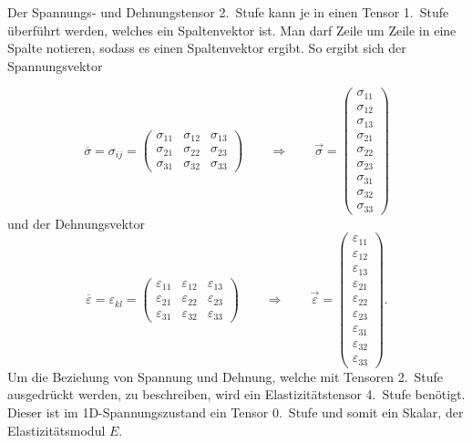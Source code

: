 Der Spannungs- und Dehnungstensor 2.~Stufe kann je in einen Tensor 1.~Stufe überführt werden, welches ein Spaltenvektor ist.
Man darf Zeile um Zeile in eine Spalte notieren, sodass es einen Spaltenvektor ergibt.
So ergibt sich der Spannungsvektor

\[
\overline{\sigma}
=
\sigma_{ij}
=
\begin{pmatrix}
	\sigma_{11} & \sigma_{12} & \sigma_{13} \\ 
	\sigma_{21} & \sigma_{22} & \sigma_{23} \\
	\sigma_{31} & \sigma_{32} & \sigma_{33}
\end{pmatrix}
\qquad
\Rightarrow
\qquad
\vec{\sigma}
=
\begin{pmatrix}
	\sigma_{11}\\
	\sigma_{12}\\
	\sigma_{13}\\
	\sigma_{21}\\
	\sigma_{22}\\
	\sigma_{23}\\
	\sigma_{31}\\
	\sigma_{32}\\
	\sigma_{33}
\end{pmatrix}
\]
und der Dehnungsvektor
\[
\overline{\varepsilon}
=
\varepsilon_{kl}
=
\begin{pmatrix}
	\varepsilon_{11} & \varepsilon_{12} & \varepsilon_{13} \\ 
	\varepsilon_{21} & \varepsilon_{22} & \varepsilon_{23} \\
	\varepsilon_{31} & \varepsilon_{32} & \varepsilon_{33}
\end{pmatrix}
\qquad
\Rightarrow
\qquad
\vec{\varepsilon}
=
\begin{pmatrix}
	\varepsilon_{11} \\
	\varepsilon_{12} \\
	\varepsilon_{13} \\
	\varepsilon_{21} \\
	\varepsilon_{22} \\
	\varepsilon_{23} \\
	\varepsilon_{31} \\
	\varepsilon_{32} \\
	\varepsilon_{33}
\end{pmatrix}
.
\]
Um die Beziehung von Spannung und Dehnung, welche mit Tensoren 2.~Stufe ausgedrückt werden, zu beschreiben, wird ein Elastizitätstensor 4.~Stufe benötigt.
%
Dieser ist im 1D-Spannungszustand ein Tensor 0.~Stufe und somit ein Skalar, der Elastizitätsmodul $E$.

